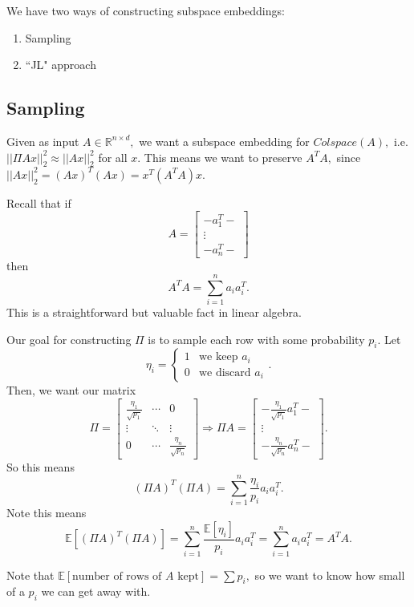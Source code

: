 \documentclass[11pt]{article}
\begin{document}
We have two ways of constructing subspace embeddings:

\begin{enumerate}
    \item Sampling
    \item ``JL" approach
\end{enumerate}

\subsection{Sampling}
    Given as input $A \in \mathbb{R}^{n \times d},$ we want a subspace embedding for $Colspace(A),$ i.e. $||\Pi A x||_2^2 \approx ||Ax||_2^2$ for all $x$.  This means we want to preserve $A^T A,$ since $||Ax||_2^2 = (Ax)^T (Ax) = x^T (A^T A) x.$
    
    Recall that if $$A = \begin{bmatrix} -a_1^T-\\ \vdots \\ -a_n^T- \end{bmatrix}$$ then $$A^T A = \sum\limits_{i = 1}^{n} a_i a_i^T.$$  This is a straightforward but valuable fact in linear algebra.
    
    Our goal for constructing $\Pi$ is to sample each row with some probability $p_i.$  Let $$\eta_i = \begin{cases}1 & \text{we keep } a_i \\ 0 & \text{we discard } a_i \end{cases}.$$  Then, we want our matrix $$\Pi = \begin{bmatrix} \frac{\eta_1}{\sqrt{p_1}} & \cdots & 0 \\ \vdots & \ddots & \vdots \\0 & \cdots & \frac{\eta_n}{\sqrt{p_n}} \end{bmatrix} \Rightarrow \Pi A = \begin{bmatrix} -\frac{\eta_1}{\sqrt{p_1}} a_1^T-\\ \vdots \\ -\frac{\eta_n}{\sqrt{p_n}} a_n^T- \end{bmatrix}.$$  So this means $$(\Pi A)^T (\Pi A) = \sum\limits_{i = 1}^{n} \frac{\eta_i}{p_i} a_i a_i^T.$$  Note this means $$\mathbb{E}[(\Pi A)^T (\Pi A)] = \sum\limits_{i = 1}^{n} \frac{\mathbb{E}[\eta_i]}{p_i} a_i a_i^T = \sum\limits_{i = 1}^{n} a_i a_i^T = A^T A.$$
    
    Note that $\mathbb{E}[\text{number of rows of $A$ kept}] = \sum p_i,$ so we want to know how small of a $p_i$ we can get away with.
    
\end{document}
